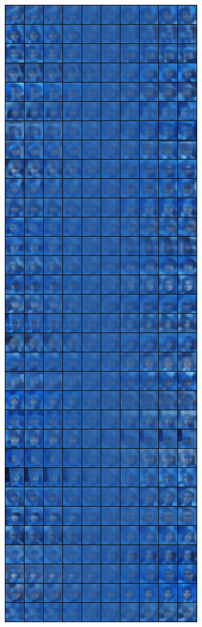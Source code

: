 \documentclass[11pt]{article}
\numberwithin{equation}{section}
\begin{document}
\begin{figure}[h]
\begin{minipage}{0.4\textwidth}
        \includegraphics[width=\textwidth]{ex02/beta0.0-variation.png}

\end{minipage}
\end{figure}
\end{document}
